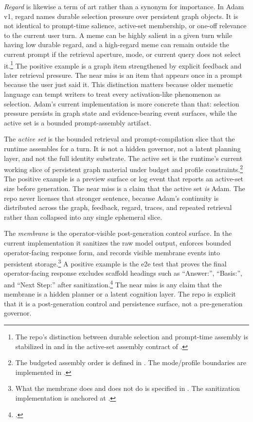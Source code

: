 \documentclass[10pt]{article}
\begin{document}
\emph{Regard} is likewise a term of art rather than a synonym for importance. In Adam v1, regard names durable selection pressure over persistent graph objects. It is not identical to prompt-time salience, active-set membership, or one-off relevance to the current user turn. A meme can be highly salient in a given turn while having low durable regard, and a high-regard meme can remain outside the current prompt if the retrieval aperture, mode, or current query does not select it.\footnote{The repo's distinction between durable selection and prompt-time assembly is stabilized in  and in the active-set assembly contract of .} The positive example is a graph item strengthened by explicit feedback and later retrieval pressure. The near miss is an item that appears once in a prompt because the user just said it. This distinction matters because older memetic language can tempt writers to treat every activation-like phenomenon as selection. Adam's current implementation is more concrete than that: selection pressure persists in graph state and evidence-bearing event surfaces, while the active set is a bounded prompt-assembly artifact.

The \emph{active set} is the bounded retrieval and prompt-compilation slice that the runtime assembles for a turn. It is not a hidden governor, not a latent planning layer, and not the full identity substrate. The active set is the runtime's current working slice of persistent graph material under budget and profile constraints.\footnote{The budgeted assembly order is defined in . The mode/profile boundaries are implemented in .} The positive example is a preview surface or log event that reports an active-set size before generation. The near miss is a claim that the active set \emph{is} Adam. The repo never licenses that stronger sentence, because Adam's continuity is distributed across the graph, feedback, regard, traces, and repeated retrieval rather than collapsed into any single ephemeral slice.

The \emph{membrane} is the operator-visible post-generation control surface. In the current implementation it sanitizes the raw model output, enforces bounded operator-facing response form, and records visible membrane events into persistent storage.\footnote{What the membrane does and does not do is specified in . The sanitization implementation is anchored at .} A positive example is the e2e test that proves the final operator-facing response excludes scaffold headings such as ``Answer:'', ``Basis:'', and ``Next Step:'' after sanitization.\footnote{.} The near miss is any claim that the membrane is a hidden planner or a latent cognition layer. The repo is explicit that it is a post-generation control and persistence surface, not a pre-generation governor.
\end{document}
